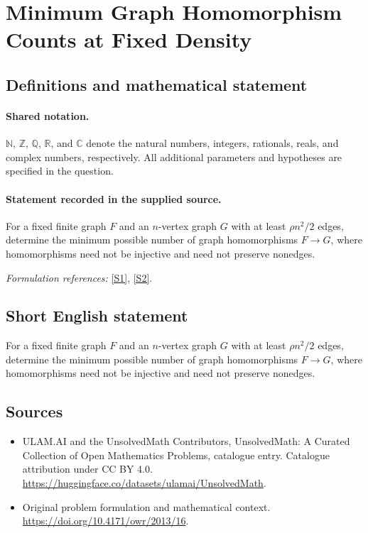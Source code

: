 \documentclass[11pt]{article}
\newcommand{\sref}[2]{\hyperlink{source:#1:#2}{[S#2]}}
\begin{document}
\section{Minimum Graph Homomorphism Counts at Fixed Density}\label{statement}

\subsection{Definitions and mathematical statement}

\paragraph{Shared notation.}$\mathbb N$, $\mathbb Z$, $\mathbb Q$, $\mathbb R$, and $\mathbb C$ denote the natural numbers, integers, rationals, reals, and complex numbers, respectively. All additional parameters and hypotheses are specified in the question.


\paragraph{Statement recorded in the supplied source.}
For a fixed finite graph $F$ and an $n$-vertex graph $G$ with at least $\rho n^2/2$ edges, determine the minimum possible number of graph homomorphisms $F\to G$, where homomorphisms need not be injective and need not preserve nonedges.
\par\smallskip\textit{Formulation references:} \sref{statement}{1}, \sref{statement}{2}.
\subsection{Short English statement}
For a fixed finite graph $F$ and an $n$-vertex graph $G$ with at least $\rho n^2/2$ edges, determine the minimum possible number of graph homomorphisms $F\to G$, where homomorphisms need not be injective and need not preserve nonedges.
\subsection{Sources}
\begin{itemize}
\item[\hypertarget{source:statement:1}{S1}] ULAM.AI and the UnsolvedMath Contributors, UnsolvedMath: A Curated Collection of Open Mathematics Problems, catalogue entry. Catalogue attribution under CC BY 4.0.
\url{https://huggingface.co/datasets/ulamai/UnsolvedMath}.
\item[\hypertarget{source:statement:2}{S2}] Original problem formulation and mathematical context.
\url{https://doi.org/10.4171/owr/2013/16}.
\end{itemize}
\label{end:statement}
\end{document}
